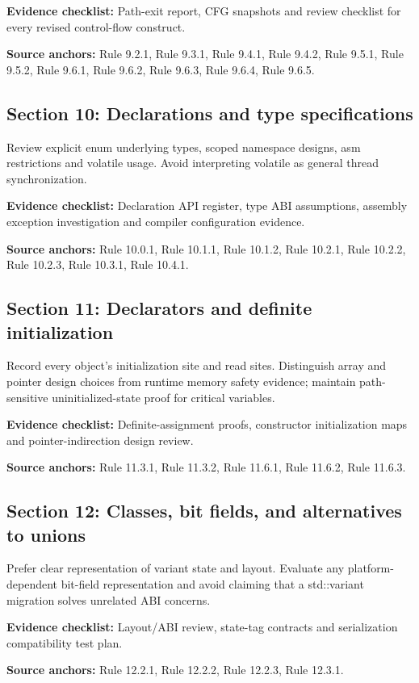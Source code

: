 \documentclass[10pt,letterpaper]{article}
\begin{document}
\textbf{Evidence checklist:} Path-exit report, CFG snapshots and review checklist for every revised control-flow construct.

\textbf{Source anchors:} Rule 9.2.1, Rule 9.3.1, Rule 9.4.1, Rule 9.4.2, Rule 9.5.1, Rule 9.5.2, Rule 9.6.1, Rule 9.6.2, Rule 9.6.3, Rule 9.6.4, Rule 9.6.5.

\subsection{Section 10: Declarations and type specifications}
Review explicit enum underlying types, scoped namespace designs, asm restrictions and volatile usage. Avoid interpreting volatile as general thread synchronization.

\textbf{Evidence checklist:} Declaration API register, type ABI assumptions, assembly exception investigation and compiler configuration evidence.

\textbf{Source anchors:} Rule 10.0.1, Rule 10.1.1, Rule 10.1.2, Rule 10.2.1, Rule 10.2.2, Rule 10.2.3, Rule 10.3.1, Rule 10.4.1.

\subsection{Section 11: Declarators and definite initialization}
Record every object's initialization site and read sites. Distinguish array and pointer design choices from runtime memory safety evidence; maintain path-sensitive uninitialized-state proof for critical variables.

\textbf{Evidence checklist:} Definite-assignment proofs, constructor initialization maps and pointer-indirection design review.

\textbf{Source anchors:} Rule 11.3.1, Rule 11.3.2, Rule 11.6.1, Rule 11.6.2, Rule 11.6.3.

\subsection{Section 12: Classes, bit fields, and alternatives to unions}
Prefer clear representation of variant state and layout. Evaluate any platform-dependent bit-field representation and avoid claiming that a std::variant migration solves unrelated ABI concerns.

\textbf{Evidence checklist:} Layout/ABI review, state-tag contracts and serialization compatibility test plan.

\textbf{Source anchors:} Rule 12.2.1, Rule 12.2.2, Rule 12.2.3, Rule 12.3.1.
\end{document}
